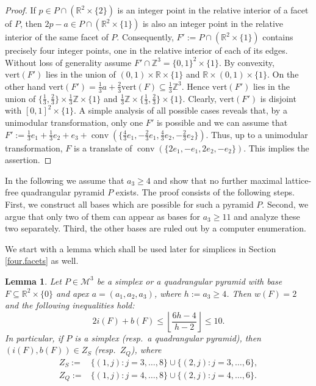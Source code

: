 \documentclass[a4paper]{article}
\theoremstyle{plain}
\newtheorem{lemma}[nn]{Lemma}
\begin{document}
\begin{proof}
If $p \in P \cap ({\mathbb{R}}^2 \times \{2\})$ is an integer point in
the relative interior of a facet of $P$, then $2p - a \in P
\cap ({\mathbb{R}}^2 \times \{1\})$ is also an integer point in the
relative interior of the same facet of $P$.
Consequently, $F' := P \cap ({\mathbb{R}}^2 \times \{1\})$ contains
precisely four integer points, one in the relative interior
of each of its edges.
Without loss of generality assume $F'\cap {\mathbb{Z}}^3 = \{0,1\}^2
\times \{1\}$.
By convexity, ${\mathrm{vert}}(F')$ lies in the union of $(0,1)
\times {\mathbb{R}} \times \{1\}$ and ${\mathbb{R}} \times (0,1) \times \{1\}$.
On the other hand ${\mathrm{vert}}(F') = \frac{1}{3} a + \frac{2}{3}
{\mathrm{vert}}(F) \subseteq \frac{1}{3} {\mathbb{Z}}^3$.
Hence ${\mathrm{vert}}(F')$ lies in the union of
$\{\frac{1}{3},\frac{2}{3}\} \times \frac{1}{3} {\mathbb{Z}} \times
\{1\}$ and $\frac{1}{3} {\mathbb{Z}} \times
\{\frac{1}{3},\frac{2}{3}\} \times \{1\}$.
Clearly, ${\mathrm{vert}}(F')$ is disjoint with $[0,1]^2 \times
\{1\}$.
A simple analysis of all possible cases reveals that, by a
unimodular transformation, only one $F'$ is possible and we
can assume that $F' := \frac{1}{3} e_1 + \frac{1}{3} e_2 +
e_3 + {{\mathop{\mathrm{{conv}}}}}(\{\frac{4}{3} e_1, -\frac{2}{3} e_1, \frac{4}{3}
e_2, -\frac{2}{3} e_2\})$.
Thus, up to a unimodular transformation, $F$ is a translate
of ${{\mathop{\mathrm{{conv}}}}}(\{2 e_1, -e_1, 2 e_2, -e_2\})$.
This implies the assertion. 
\end{proof}

In the following we assume that $a_3 \geq 4$ and show that
no further maximal lattice-free quadrangular pyramid $P$
exists.
The proof consists of the following steps.
First, we construct all bases which are possible for such
a pyramid $P$.
Second, we argue that only two of them can appear as bases
for $a_3 \geq 11$ and analyze these two separately.
Third, the other bases are ruled out by a computer
enumeration. 

We start with a lemma which shall be used later for
simplices in Section \ref{four.facets} as well.

\begin{lemma} \label{2ineq}
Let $P \in {\mathcal{M}^3}$ be a simplex or a quadrangular pyramid with
base $F \subseteq {\mathbb{R}}^2 \times \{0\}$ and apex $a = (a_1,
a_2, a_3)$, where $h := a_3 \geq 4$.
Then $w(F) = 2$ and the following inequalities hold:
\begin{equation} \label{bases.bound}
  2 i(F) + b(F) \le {\left\lfloor {\frac{6h-4}{h-2}} \right\rfloor} \le 10.
\end{equation}
In particular, if $P$ is a simplex (resp.~a quadrangular
pyramid), then $(i(F),b(F)) \in Z_S$ (resp.~$Z_Q$),  where
\begin{align*}
Z_S :=& \{(1,j) : j = 3, \dots, 8\} \cup \{(2,j) : j = 3,
\dots, 6\}, \\ 
Z_Q :=& \{(1,j) : j = 4, \dots, 8\} \cup \{(2,j) : j = 4,
\dots, 6\}.
\end{align*}
\end{lemma}
\end{document}
